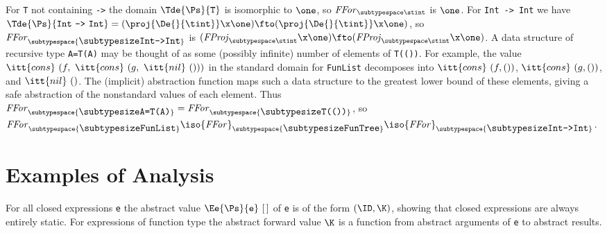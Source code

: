 \begin{article}
For \mbox{\tt T} not containing \mbox{\tt ->} the domain $\Tde{\Ps}{\mbox{\tt T}}$ is isomorphic
to $\one$, so ${\it{}FFor}_{\subtypespace\stint}$ is $\one$.  For \mbox{\tt Int}\ \mbox{\tt ->}\ \mbox{\tt Int}
we have
$\Tde{\Ps}{\mbox{\tt Int}\ \mbox{\tt ->}\ \mbox{\tt Int}}=(\proj{\De{}{\tint}}\x\one)\fto(\proj{\De{}{\tint}}\x\one)$,
so ${\it{}FFor}_{\subtypespace{\makebox{\subtypesize\tt Int->Int}} }$ is
$({\it{}FProj}_{\subtypespace\stint}\x\one)\fto({\it{}FProj}_{\subtypespace\stint}\x\one)$.  A
data structure of recursive type \mbox{\tt A=T(A)} may be thought of as some
(possibly infinite) number of elements of \mbox{\tt T(())}.  For example, the
value $\itt{cons}\ (f,\ \itt{cons}\ (g,\ \itt{nil}\ ()))$ in the
standard domain for \mbox{\tt FunList} decomposes into $\itt{cons}\ (f,())$,
$\itt{cons}\ (g,())$, and $\itt{nil}\ ()$.  The (implicit) abstraction
function maps such a data structure to the greatest lower bound of
these elements, giving a safe abstraction of the nonstandard values of
each element.  Thus
${\it{}FFor}_{\subtypespace{\makebox{\subtypesize\tt A=T(A)}} }={\it{}FFor}_{\subtypespace{\makebox{\subtypesize\tt T(())}} }$, so
${\it{}FFor}_{\subtypespace{\makebox{\subtypesize\tt FunList}} }\iso{\it{}FFor}_{\subtypespace{\makebox{\subtypesize\tt FunTree}} }\iso{\it{}FFor}_{\subtypespace{\makebox{\subtypesize\tt Int->Int}} }$.



\section{Examples of Analysis}

For all closed expressions \mbox{\tt e} the abstract value
$\Ee{\Ps}{\mbox{\tt e}}~[\,]$ of \mbox{\tt e} is of the form $(\ID,\K)$, showing
that closed expressions are always entirely static.  For expressions of
function type the abstract forward value $\K$ is a function from
abstract arguments of \mbox{\tt e} to abstract results.


\end{article}
